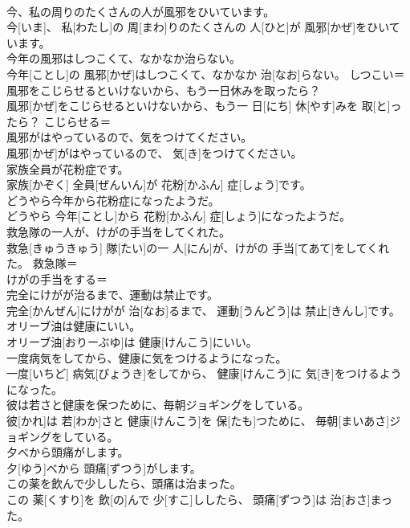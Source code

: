\documentclass[8pt]{extreport}
\begin{document}
\begin{CJK}{UTF8}{min}
\\	今、私の周りのたくさんの人が風邪をひいています。	
\\	今[いま]、 私[わたし]の 周[まわ]りのたくさんの 人[ひと]が 風邪[かぜ]をひいています。	
\\	今年の風邪はしつこくて、なかなか治らない。	
\\	今年[ことし]の 風邪[かぜ]はしつこくて、なかなか 治[なお]らない。	しつこい＝ 
\\	風邪をこじらせるといけないから、もう一日休みを取ったら？	
\\	風邪[かぜ]をこじらせるといけないから、もう一 日[にち] 休[やす]みを 取[と]ったら？	こじらせる＝ 
\\	風邪がはやっているので、気をつけてください。	
\\	風邪[かぜ]がはやっているので、 気[き]をつけてください。	
\\	家族全員が花粉症です。	
\\	家族[かぞく] 全員[ぜんいん]が 花粉[かふん] 症[しょう]です。	
\\	どうやら今年から花粉症になったようだ。	
\\	どうやら 今年[ことし]から 花粉[かふん] 症[しょう]になったようだ。	
\\	救急隊の一人が、けがの手当をしてくれた。	
\\	救急[きゅうきゅう] 隊[たい]の一 人[にん]が、けがの 手当[てあて]をしてくれた。	救急隊＝ 
\\	けがの手当をする＝ 
\\	完全にけがが治るまで、運動は禁止です。	
\\	完全[かんぜん]にけがが 治[なお]るまで、 運動[うんどう]は 禁止[きんし]です。	
\\	オリーブ油は健康にいい。	
\\	オリーブ油[おりーぶゆ]は 健康[けんこう]にいい。	
\\	一度病気をしてから、健康に気をつけるようになった。	
\\	一度[いちど] 病気[びょうき]をしてから、 健康[けんこう]に 気[き]をつけるようになった。	
\\	彼は若さと健康を保つために、毎朝ジョギングをしている。	
\\	彼[かれ]は 若[わか]さと 健康[けんこう]を 保[たも]つために、 毎朝[まいあさ]ジョギングをしている。	
\\	夕べから頭痛がします。	
\\	夕[ゆう]べから 頭痛[ずつう]がします。	
\\	この薬を飲んで少ししたら、頭痛は治まった。	
\\	この 薬[くすり]を 飲[の]んで 少[すこ]ししたら、 頭痛[ずつう]は 治[おさ]まった。	

\end{CJK}
\end{document}
